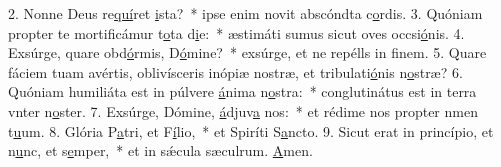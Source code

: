 2. Nonne Deus re\uline{quí}ret \uline{i}sta?~* ipse enim novit abscóndta c\uline{o}rdis.
3. Quóniam propter te mortificámur t\uline{o}ta d\uline{i}e:~* æstimáti sumus sicut oves occsi\uline{ó}nis.
4. Exsúrge, quare obd\uline{ó}rmis, D\uline{ó}mine?~* exsúrge, et ne repélls in f\uline{i}nem.
5. Quare fáciem tuam avértis, oblivísceris inópiæ nostræ, et tribulati\uline{ó}nis n\uline{o}stræ?
6. Quóniam humiliáta est in púlvere \uline{á}nima n\uline{o}stra:~* conglutinátus est in terra vnter n\uline{o}ster.
7. Exsúrge, Dómine, \uline{á}djuv\uline{a} nos:~* et rédime nos propter nmen t\uline{u}um.
8. Glória P\uline{a}tri, et F\uline{í}lio,~* et Spiríti S\uline{a}ncto.
9. Sicut erat in princípio, et n\uline{u}nc, et s\uline{e}mper,~* et in sǽcula sæculrum. \uline{A}men.
